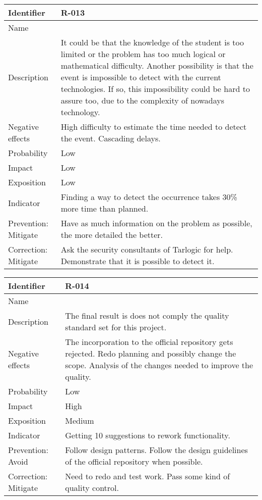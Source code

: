 \begin{table}[H]
	\begin{tabularx}{\textwidth}{|y|z|}
		\hline
		Identifier & \textbf{R-013} \\ \hline
		Name & \Rtrece \\ \hline
		Description &
			It could be that the knowledge of the student is too limited or the problem has too much logical or mathematical difficulty.\linej
			Another possibility is that the event is impossible to detect with the current technologies. If so, this impossibility could be hard to assure too, due to the complexity of nowadays technology.
		\\ \hline
		Negative effects &
			High difficulty to estimate the time needed to detect the event. \linej
			Cascading delays.
		\\ \hline
		Probability & Low\\ \hline
		Impact &  Low\\ \hline
		Exposition &  Low\\ \hline
		Indicator & Finding a way to detect the occurrence takes 30\% more time than planned.\\ \hline
		Prevention: Mitigate &
			Have as much information on the problem as possible, the more detailed the better.
		\\ \hline
		Correction: Mitigate &
			Ask the security consultants of Tarlogic for help. \linej
			Demonstrate that it is possible to detect it.
		\\ \hline
	\end{tabularx}
\end{table}

\begin{table}[H]
	\begin{tabularx}{\textwidth}{|y|z|}
		\hline
		Identifier & \textbf{R-014} \\ \hline
		Name & \Rcatorce \\ \hline
		Description &
			The final result is does not comply the quality standard set for this project.
		\\ \hline
		Negative effects &
			The incorporation to the official repository gets rejected.\linej
			Redo planning and possibly change the scope.  \linej
			Analysis of the changes needed to improve the quality.
		\\ \hline
		Probability & Low\\ \hline
		Impact &  High\\ \hline
		Exposition &  Medium\\ \hline
		Indicator & Getting 10 suggestions to rework functionality.\\ \hline
		Prevention: Avoid &
			Follow design patterns. \linej
			Follow the design guidelines of the official repository when possible.
		\\ \hline
		Correction: Mitigate &
			Need to redo and test work. \linej
			Pass some kind of quality control.
		\\ \hline
	\end{tabularx}
\end{table}

